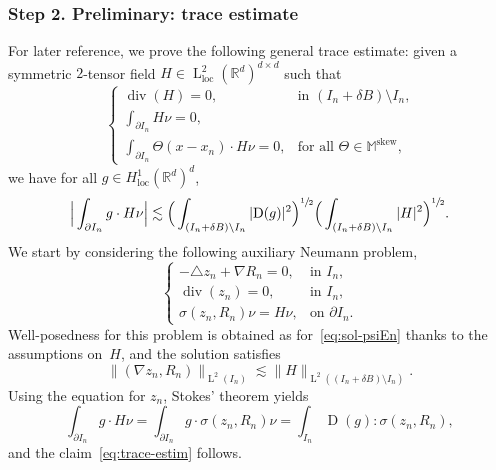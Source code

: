 \documentclass[JEP,XML,SOM,Unicode,published]{cedram}
\newcounter{assumption}
\theoremstyle{plain}
\theoremstyle{definition}
\newcommand{\R}{\mathbb R}
\newcommand{\Md}{\mathbb M}
\newcommand{\loc}{{\operatorname{loc}}}
\newcommand{\D}{\operatorname{D}}
\newcommand{\Ld}{\operatorname{L}}
\newcommand{\Div}{{\operatorname{div}}}
\newcommand{\Skew}{{\operatorname{skew}}}
\newcommand{\step}[1]{\subsubsection*{Step #1}}
\begin{document}
\step{2. Preliminary: trace estimate}
For later reference, we prove the following general trace estimate: given a symmetric $2$-tensor field $H\in \Ld^2_\loc(\R^d)^{d\times d}$ such that
\[
\begin{cases}
\Div(H)=0,&\text{in $(I_n+\delta B)\setminus I_n$,}\\
\int_{\partial I_n}H\nu=0,&\\
\int_{\partial I_n}\Theta(x-x_n)\cdot H\nu=0,&\text{for all $\Theta\in\Md^\Skew$},
\end{cases}\]
we have for all $g\in H^1_\loc(\R^d)^d$,
\begin{equation}\label{eq:trace-estim}
\Big|\int_{\partial I_n}g\cdot H\nu\Big|\lesssim \Big(\int_{(I_n+\delta B)\setminus I_n}|\!\D(g)|^2\Big)^{\sfrac12}\Big(\int_{(I_n+\delta B)\setminus I_n}|H|^2\Big)^{\sfrac12}.
\end{equation}
We start by considering the following auxiliary Neumann problem,
\[
\begin{cases}
-\triangle z_n+\nabla R_n=0,&\text{in $I_n$},\\
\Div(z_n)=0,&\text{in $I_n$},\\
\sigma(z_n,R_n)\nu=H\nu,&\text{on $\partial I_n$}.
\end{cases}\]
Well-posedness for this problem is obtained as for~\eqref{eq:sol-psiEn} thanks to the assumptions on~$H$, and the solution satisfies
\[\|(\nabla z_n,R_n)\|_{\Ld^2(I_n)}\lesssim \|H\|_{\Ld^2((I_n+\delta B)\setminus I_n)}.\]
Using the equation for $z_n$, Stokes' theorem yields
\[\int_{\partial I_n}g\cdot H\nu=\int_{\partial I_n}g\cdot \sigma(z_n,R_n)\nu=\int_{I_n}\D(g): \sigma(z_n,R_n),\]
and the claim~\eqref{eq:trace-estim} follows.
\end{document}
